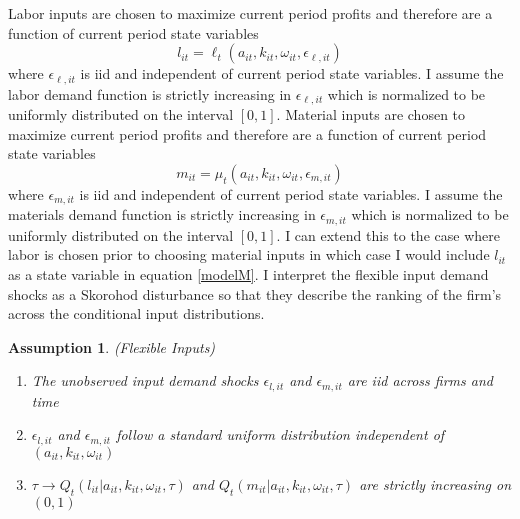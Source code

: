 \documentclass{article}
\newtheorem{assump}{Assumption}[section]
\begin{document}
Labor inputs are chosen to maximize current period profits and therefore are a function of current period state variables
\begin{equation} \label{modelL}
l_{it}=\ell_{t}(a_{it}, k_{it}, \omega_{it}, \epsilon_{\ell,it})
\end{equation}
where $\epsilon_{\ell, it}$ is iid and independent of current period state variables. I assume the labor demand function is strictly increasing in $\epsilon_{\ell, it}$ which is normalized to be uniformly distributed on the interval $[0,1]$. Material inputs are chosen to maximize current period profits and therefore are a function of current period state variables
\begin{equation} \label{modelM}
m_{it}=\mu_{t}(a_{it}, k_{it}, \omega_{it}, \epsilon_{m,it})
\end{equation}
where $\epsilon_{m,it}$ is iid and independent of current period state variables. I assume the materials demand function is strictly increasing in $\epsilon_{m,it}$ which is normalized to be uniformly distributed on the interval $[0,1]$. I can extend this to the case where labor is chosen prior to choosing material inputs in which case I would include $l_{it}$ as a state variable in equation \eqref{modelM}. I interpret the flexible input demand shocks as a Skorohod disturbance so that they describe the ranking of the firm's across the conditional input distributions.

\begin{assump} (Flexible Inputs) \label{inputs1}
~
\begin{enumerate}[label=(\alph*)]
	\item The unobserved input demand shocks $\epsilon_{l,it}$ and $\epsilon_{m,it}$ are iid across firms and time
    \item $\epsilon_{l,it}$ and $\epsilon_{m,it}$ follow a standard uniform distribution independent of $(a_{it}, k_{it}, \omega_{it})$
    \item $\tau\rightarrow Q_{t}(l_{it}|a_{it}, k_{it}, \omega_{it}, \tau)$ and $Q_{t}(m_{it}|a_{it}, k_{it}, \omega_{it}, \tau)$ are strictly increasing on $(0,1)$
\end{enumerate}
\end{assump}
\end{document}
